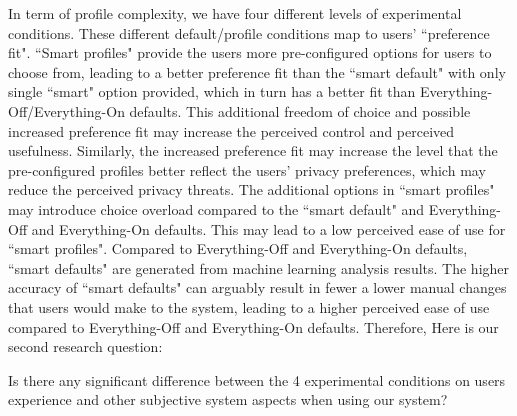 In term of profile complexity, we have four different levels of experimental conditions. These different default/profile conditions map to users' ``preference fit". ``Smart profiles" provide the users more pre-configured options for users to choose from, leading to a better preference fit than the ``smart default" with only single ``smart" option provided, which in turn has a better fit than Everything-Off/Everything-On defaults. This additional freedom of choice and possible increased preference fit may increase the perceived control and perceived usefulness. Similarly, the increased preference fit may increase the level that the pre-configured profiles better reflect the users' privacy preferences, which may reduce the perceived privacy threats. The additional options in ``smart profiles" may introduce choice overload compared to the ``smart default" and Everything-Off and Everything-On defaults. This may lead to a low perceived ease of use for ``smart profiles". Compared to Everything-Off and Everything-On defaults, ``smart defaults" are generated from machine learning analysis results. The higher accuracy of ``smart defaults" can arguably result in fewer a lower manual changes that users would make to the system, leading to a higher perceived ease of use compared to Everything-Off and Everything-On defaults. Therefore, Here is our second research question:
\theoremgroup
\begin{theorem}
	Is there any significant difference between the 4 experimental conditions on users experience and other subjective system aspects when using our system?
\end{theorem}

